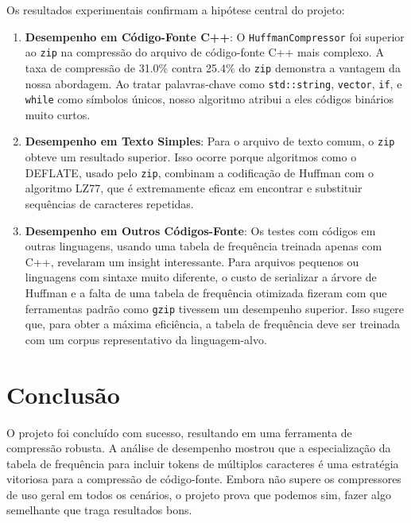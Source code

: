 \documentclass[12pt, a4paper]{article}
\begin{document}
Os resultados experimentais confirmam a hipótese central do projeto:
\begin{enumerate}
    \item \textbf{Desempenho em Código-Fonte C++}: O \texttt{HuffmanCompressor} foi superior ao \texttt{zip} na compressão do arquivo de código-fonte C++ mais complexo. A taxa de compressão de 31.0\% contra 25.4\% do \texttt{zip} demonstra a vantagem da nossa abordagem. Ao tratar palavras-chave como \texttt{std::string}, \texttt{vector}, \texttt{if}, e \texttt{while} como símbolos únicos, nosso algoritmo atribui a eles códigos binários muito curtos.
    
    \item \textbf{Desempenho em Texto Simples}: Para o arquivo de texto comum, o \texttt{zip} obteve um resultado superior. Isso ocorre porque algoritmos como o DEFLATE, usado pelo \texttt{zip}, combinam a codificação de Huffman com o algoritmo LZ77, que é extremamente eficaz em encontrar e substituir sequências de caracteres repetidas.
    
    \item \textbf{Desempenho em Outros Códigos-Fonte}: Os testes com códigos em outras linguagens, usando uma tabela de frequência treinada apenas com C++, revelaram um insight interessante. Para arquivos pequenos ou linguagens com sintaxe muito diferente, o custo de serializar a árvore de Huffman e a falta de uma tabela de frequência otimizada fizeram com que ferramentas padrão como \texttt{gzip} tivessem um desempenho superior. Isso sugere que, para obter a máxima eficiência, a tabela de frequência deve ser treinada com um corpus representativo da linguagem-alvo.
\end{enumerate}

\section{Conclusão}

O projeto foi concluído com sucesso, resultando em uma ferramenta de compressão robusta. A análise de desempenho mostrou que a especialização da tabela de frequência para incluir tokens de múltiplos caracteres é uma estratégia vitoriosa para a compressão de código-fonte. Embora não supere os compressores de uso geral em todos os cenários, o projeto prova que podemos sim, fazer algo semelhante que traga resultados bons. 
\end{document}
